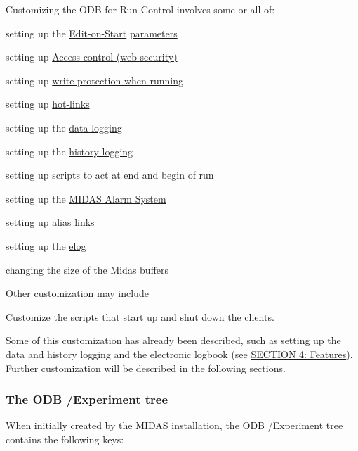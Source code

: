Customizing the ODB for Run Control involves some or all of:
\begin{DoxyItemize}
\item setting up the \hyperlink{RC_customize_ODB_RC_Edit_On_Start}{Edit-\/on-\/Start} \hyperlink{structparameters}{parameters}
\item setting up \hyperlink{RC_customize_ODB_RC_Access_Control}{Access control (web security)}
\item setting up \hyperlink{RC_customize_ODB_RC_Lock_when_Running}{write-\/protection when running}
\item setting up \hyperlink{RC_Hot_Link}{hot-\/links}
\item setting up the \hyperlink{F_Logging_Data}{data logging}
\item setting up the \hyperlink{F_History_logging}{history logging}
\item setting up scripts to act at end and begin of run
\item setting up the \hyperlink{RC_customize_ODB_RC_Alarm_System}{MIDAS Alarm System}
\item setting up \hyperlink{RC_mhttpd_Alias_page}{alias links}
\item setting up the \hyperlink{F_Elog}{elog}
\item changing the size of the Midas buffers
\end{DoxyItemize}

Other customization may include
\begin{DoxyItemize}
\item \hyperlink{RC_customize_ODB_RC_starting_clients}{Customize the scripts that start up and shut down the clients.}
\end{DoxyItemize}

Some of this customization has already been described, such as setting up the data and history logging and the electronic logbook (see \hyperlink{Features}{SECTION 4: Features}). Further customization will be described in the following sections.





\label{RC_customize_ODB_idx_ODB_tree_Experiment}
\hypertarget{RC_customize_ODB_idx_ODB_tree_Experiment}{}
 \hypertarget{RC_customize_ODB_RC_ODB_Experiment_Tree}{}\subsubsection{The ODB /Experiment tree}\label{RC_customize_ODB_RC_ODB_Experiment_Tree}
When initially created by the MIDAS installation, the ODB /Experiment tree contains the following keys:


